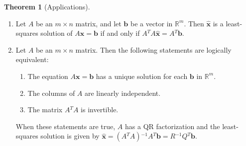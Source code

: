 \documentclass{myart}
\renewcommand{\vec}[1]{\ensuremath{\mathbf{#1}}} %
\newcommand{\mat}[1]{\ensuremath{#1}} %
\newcommand{\R}[1][]{\ensuremath{\mathbb{R}^{#1}}} %
\newcommand{\by}{\ensuremath{\times}} %
\newcommand{\inv}{\ensuremath{^{-1}}} %
\newcommand{\trans}{\ensuremath{^T}} %
\theoremstyle{definition}
\newtheorem{thm}{Theorem}
\begin{document}
\begin{thm}[Applications]
\begin{enumerate}
\item Let \mat A be an $m \by n$ matrix, and let \vec b be a vector in \R[m]. Then \vec{\hat x} is a least-squares solution of $\mat A \vec x = \vec b$ if and only if $\mat A\trans \mat A \vec{\hat x} = \mat A\trans \vec b$.
\item Let \mat A be an $m \by n$ matrix. Then the following statements are logically equivalent:
\begin{enumerate}
\item The equation $\mat A \vec x = \vec b$ has a unique solution for each \vec b in \R[m].
\item The columns of \mat A are linearly independent.
\item The matrix $\mat A\trans \mat A$ is invertible.
\end{enumerate}
When these statements are true, \mat A has a QR factorization and the least-squares solution is given by $\vec{\hat x} = (\mat A\trans \mat A)\inv \mat A\trans \vec b = \mat R\inv \mat Q\trans \vec b$.
\end{enumerate}
\end{thm}
\end{document}
